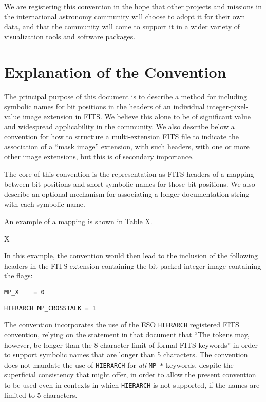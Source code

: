 \documentclass[DM,authoryear,toc]{lsstdoc}
\begin{document}
We are registering this convention in the hope that other projects
and missions in the international astronomy community will choose
to adopt it for their own data, and that the community will come to
support it in a wider variety of visualization tools and software
packages.

\section{Explanation of the Convention}

The principal purpose of this document is to describe a method for
including symbolic names for bit positions in the headers of an
individual integer-pixel-value image extension in FITS.
We believe this alone to be of significant value and widespread
applicability in the community.
We also describe below a convention for how to structure a
multi-extension FITS file to indicate the association of a ``mask
image'' extension, with such headers, with one or more other
image extensions, but this is of secondary importance.

The core of this convention is the representation as FITS headers
of a mapping between bit positions and short symbolic names for
those bit positions.
We also describe an optional mechanism for associating a longer
documentation string with each symbolic name.

An example of a mapping is shown in Table X.

X

In this example, the convention would then lead to the inclusion
of the following headers in the FITS extension containing the
bit-packed integer image containing the flags:

\verb|MP_X    = 0|

\verb|HIERARCH MP_CROSSTALK = 1|

The convention incorporates the use of the ESO \verb|HIERARCH|
registered FITS convention,
relying on the statement in that document that ``The tokens may,
however, be longer than the 8 character limit of formal FITS
keywords'' in order to support symbolic names that are longer
than 5 characters.
The convention does not mandate the use of \verb|HIERARCH| for
\emph{all} \verb|MP_*| keywords, despite the superficial
consistency that might offer, in order to allow the present
convention to be used even in contexts in which \verb|HIERARCH|
is not supported, if the names are limited to 5 characters.
\end{document}
